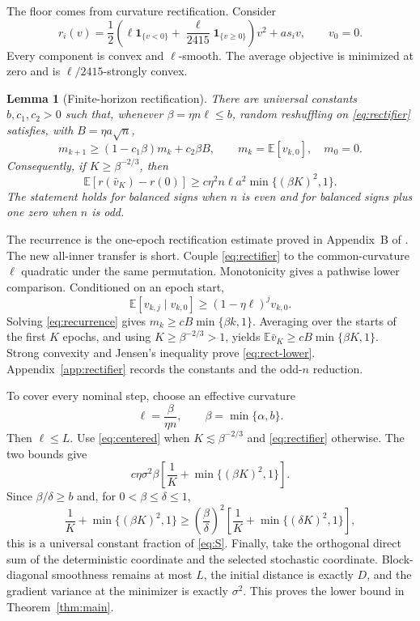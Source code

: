\documentclass{article}
\newtheorem{lemma}[theorem]{Lemma}
\theoremstyle{remark}
\newcommand{\E}{\mathbb E}
\newcommand{\1}{\mathbf 1}
\begin{document}
The floor comes from curvature rectification. Consider
\begin{equation}
 r_i(v)=\frac12\left(
   \ell\1_{\{v<0\}}+\frac\ell{2415}\1_{\{v\geq0\}}
 \right)v^2+a s_i v,
 \qquad v_0=0.                                        \label{eq:rectifier}
\end{equation}
Every component is convex and $\ell$-smooth. The average objective is minimized at zero and is $\ell/2415$-strongly convex.

\begin{lemma}[Finite-horizon rectification]\label{lem:rectifier}
There are universal constants $b,c_1,c_2>0$ such that, whenever $\beta=\eta n\ell\leq b$, random reshuffling on \eqref{eq:rectifier} satisfies, with $B=\eta a\sqrt n$,
\begin{equation}
 m_{k+1}\geq(1-c_1\beta)m_k+c_2\beta B,
 \qquad m_k=\E[v_{k,0}],\quad m_0=0.                  \label{eq:recurrence}
\end{equation}
Consequently, if $K\geq\beta^{-2/3}$, then
\begin{equation}
 \E[r(\bar v_K)-r(0)]
 \geq c\eta^2n\ell a^2\min\{(\beta K)^2,1\}.        \label{eq:rect-lower}
\end{equation}
The statement holds for balanced signs when $n$ is even and for balanced signs plus one zero when $n$ is odd.
\end{lemma}

The recurrence is the one-epoch rectification estimate proved in Appendix~B of \citet{cha2023tighter}. The new all-inner transfer is short. Couple \eqref{eq:rectifier} to the common-curvature $\ell$ quadratic under the same permutation. Monotonicity gives a pathwise lower comparison. Conditioned on an epoch start, \[ \E[v_{k,j}\mid v_{k,0}]\geq(1-\eta\ell)^jv_{k,0}. \] Solving \eqref{eq:recurrence} gives $m_k\geq cB\min\{\beta k,1\}$. Averaging over the starts of the first $K$ epochs, and using $K\geq\beta^{-2/3}>1$, yields $\E\bar v_K\geq cB\min\{\beta K,1\}$. Strong convexity and Jensen's inequality prove \eqref{eq:rect-lower}. Appendix~\ref{app:rectifier} records the constants and the odd-$n$ reduction.

To cover every nominal step, choose an effective curvature
\begin{equation}
 \ell=\frac{\beta}{\eta n},
 \qquad \beta=\min\{\alpha,b\}.                       \label{eq:rescale}
\end{equation}
Then $\ell\leq L$. Use \eqref{eq:centered} when $K\lesssim\beta^{-2/3}$ and \eqref{eq:rectifier} otherwise. The two bounds give \[ c\eta\sigma^2\beta \left[\frac1K+\min\{(\beta K)^2,1\}\right]. \] Since $\beta/\delta\geq b$ and, for $0<\beta\leq\delta\leq1$, \[ \frac1K+\min\{(\beta K)^2,1\} \geq\left(\frac\beta\delta\right)^2 \left[\frac1K+\min\{(\delta K)^2,1\}\right], \] this is a universal constant fraction of \eqref{eq:S}. Finally, take the orthogonal direct sum of the deterministic coordinate and the selected stochastic coordinate. Block-diagonal smoothness remains at most $L$, the initial distance is exactly $D$, and the gradient variance at the minimizer is exactly $\sigma^2$. This proves the lower bound in Theorem~\ref{thm:main}.
\end{document}
